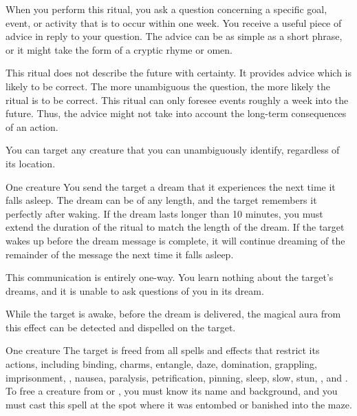 \spellline
\spelleffect When you perform this ritual, you ask a question concerning a specific goal, event, or activity that is to occur within one week. You receive a useful piece of advice in reply to your question. The advice can be as simple as a short phrase, or it might take the form of a cryptic rhyme or omen. 

This ritual does not describe the future with certainty. It provides advice which is likely to be correct. The more unambiguous the question, the more likely the ritual is to be correct.
\spellnotes This ritual can only foresee events roughly a week into the future. Thus, the advice might not take into account the long-term consequences of an action.

\spellspecial You can target any creature that you can unambiguously identify, regardless of its location.
\begin{spelltarget}{One creature}
    \spelleffect You send the target a dream that it experiences the next time it falls asleep. The dream can be of any length, and the target remembers it perfectly after waking. If the dream lasts longer than 10 minutes, you must extend the duration of the ritual to match the length of the dream. If the target wakes up before the dream message is complete, it will continue dreaming of the remainder of the message the next time it falls asleep.
\end{spelltarget}

\spellnotes This communication is entirely one-way. You learn nothing about the target's dreams, and it is unable to ask questions of you in its dream.

While the target is awake, before the dream is delivered, the magical aura from this effect can be detected and dispelled on the target.

\begin{spelltarget}{One creature}
    \spelleffect The target is freed from all spells and effects that restrict its actions, including binding, charms, entangle, daze, domination, grappling, imprisonment, , nausea, paralysis, petrification, pinning, sleep, slow, stun, , and . To free a creature from  or , you must know its name and background, and you must cast this spell at the spot where it was entombed or banished into the maze.
\end{spelltarget}

